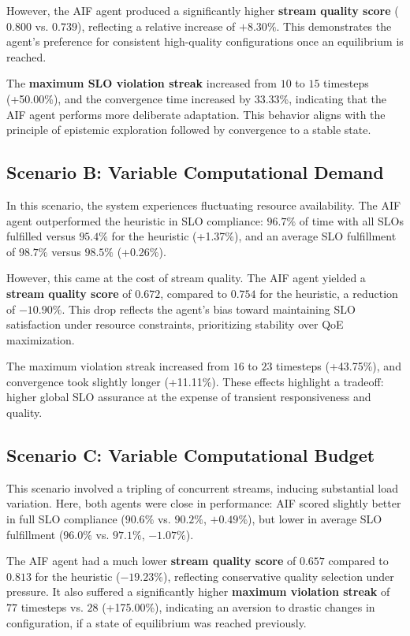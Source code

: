 However, the AIF agent produced a significantly higher \textbf{stream quality score} (\(0.800\) vs. \(0.739\)), reflecting a relative increase of \(+8.30\%\). This demonstrates the agent’s preference for consistent high-quality configurations once an equilibrium is reached.

The \textbf{maximum SLO violation streak} increased from \(10\) to \(15\) timesteps (+50.00\%), and the convergence time increased by 33.33\%, indicating that the AIF agent performs more deliberate adaptation. This behavior aligns with the principle of epistemic exploration followed by convergence to a stable state.

\subsection{Scenario B: Variable Computational Demand}

In this scenario, the system experiences fluctuating resource availability. The AIF agent outperformed the heuristic in SLO compliance: \(96.7\%\) of time with all SLOs fulfilled versus \(95.4\%\) for the heuristic (+1.37\%), and an average SLO fulfillment of \(98.7\%\) versus \(98.5\%\) (+0.26\%).

However, this came at the cost of stream quality. The AIF agent yielded a \textbf{stream quality score} of \(0.672\), compared to \(0.754\) for the heuristic, a reduction of \(-10.90\%\). This drop reflects the agent’s bias toward maintaining SLO satisfaction under resource constraints, prioritizing stability over QoE maximization.

The maximum violation streak increased from \(16\) to \(23\) timesteps (+43.75\%), and convergence took slightly longer (+11.11\%). These effects highlight a tradeoff: higher global SLO assurance at the expense of transient responsiveness and quality.

\subsection{Scenario C: Variable Computational Budget}
This scenario involved a tripling of concurrent streams, inducing substantial load variation. Here, both agents were close in performance: AIF scored slightly better in full SLO compliance (\(90.6\%\) vs. \(90.2\%\), \(+0.49\%\)), but lower in average SLO fulfillment (\(96.0\%\) vs. \(97.1\%\), \(-1.07\%\)).

The AIF agent had a much lower \textbf{stream quality score} of \(0.657\) compared to \(0.813\) for the heuristic (\(-19.23\%\)), reflecting conservative quality selection under pressure. It also suffered a significantly higher \textbf{maximum violation streak} of \(77\) timesteps vs. \(28\) (+175.00\%), indicating an aversion to drastic changes in configuration, if a state of equilibrium was reached previously.

